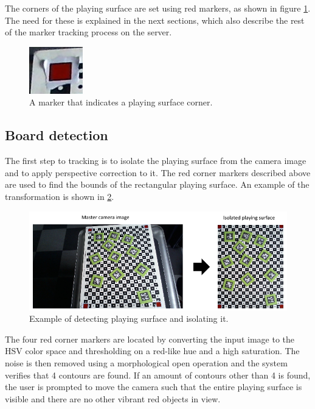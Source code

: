         The corners of the playing surface are set using red markers, as shown
        in figure \ref{fig:cornermarkers}. The need for these is explained in
        the next sections, which also describe the rest of the marker tracking
        process on the server.

        \begin{figure}[!ht]
            \centering
            \includegraphics{CornerMarker}
            \caption{A marker that indicates a playing surface corner.}
            \label{fig:cornermarkers}
        \end{figure}

        \subsection{Board detection}
            The first step to tracking is to isolate the playing surface from
            the camera image and to apply perspective correction to it. The red
            corner markers described above are used to find the bounds of the
            rectangular playing surface. An example of the transformation is
            shown in \ref{fig:boarddetection}.

            \begin{figure}[!ht]
                \centering
                \includegraphics{BoardDetection}
                \caption{Example of detecting playing surface and isolating it.}
                \label{fig:boarddetection}
            \end{figure}

            The four red corner markers are located by converting the input
            image to the HSV color space and thresholding on a red-like hue and
            a high saturation. The noise is then removed using a morphological
            open operation and the system verifies that 4 contours are found. If
            an amount of contours other than 4 is found, the user is prompted to
            move the camera such that the entire playing surface is visible and
            there are no other vibrant red objects in view.

